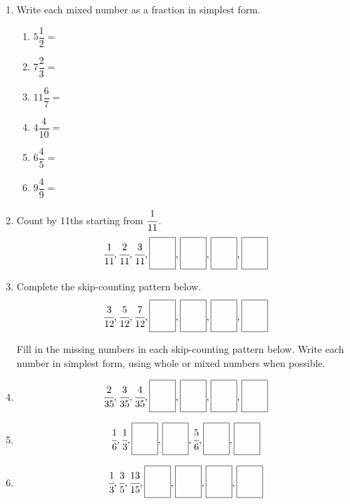 \documentclass[12pt,letterpaper]{article}
\begin{document}
\begin{large}
\begin{enumerate}
\pagebreak

\item  Write each mixed number as a fraction in simplest form.
\begin{multicols}{2}
    \begin{enumerate}
\item $5\dfrac{1}{2}=$
\item $7\dfrac{2}{3}=$
\item $11\dfrac{6}{7}=$
\item $4\dfrac{4}{10}=$
\item $6\dfrac{4}{5}=$
\item $9\dfrac{4}{9}=$
    \end{enumerate}
\end{multicols}
    
\item Count by 11ths starting from $\cfrac{1}{11}$.
\newcommand\answerbox{%
    \fbox{\rule{0.7cm}{0pt}\rule[-2ex]{0pt}{6ex}}}
\[
\cfrac{1}{11},\cfrac{2}{11},\cfrac{3}{11},\answerbox,\answerbox,\answerbox,\answerbox
\]

\item Complete the skip-counting pattern below.
\[
\cfrac{3}{12},\cfrac{5}{12},\cfrac{7}{12},\answerbox,\answerbox,\answerbox,\answerbox
\]

\begin{tcolorbox}[title=PRACTICE]
    Fill in the missing numbers in each skip-counting pattern below. Write each number in simplest form, using whole or mixed numbers when possible.
\end{tcolorbox}

\item \[
    \cfrac{2}{35},\cfrac{3}{35},\cfrac{4}{35},\answerbox,\answerbox,\answerbox,\answerbox
    \]
    \item \[
        \cfrac{1}{6},\cfrac{1}{3},\answerbox,\answerbox,\cfrac{5}{6},\answerbox,\answerbox
        \]
        \item \[
    \cfrac{1}{3},\cfrac{3}{5},\cfrac{13}{15},\answerbox,\answerbox,\answerbox,\answerbox
    \]
\end{enumerate}
\end{large}
\end{document}
